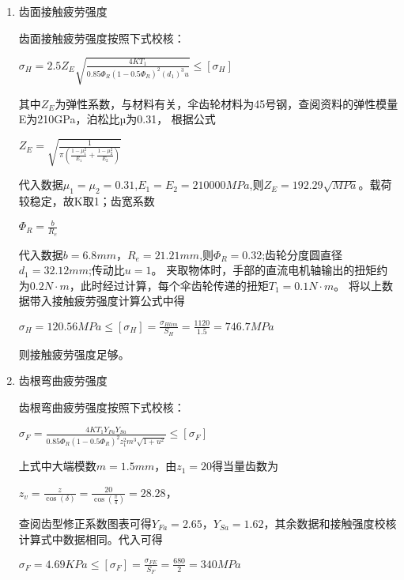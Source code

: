 \begin{enumerate}
\item 齿面接触疲劳强度

齿面接触疲劳强度按照下式校核：

\begin{center}
$\sigma_{H}=2.5Z_{E}\sqrt{\frac{4KT_{1}}{0.85\Phi_{R}(1-0.5\Phi_{R})^{2}(d_{1})^{3}u}}\le[\sigma_{H}]$
\end{center}

其中$Z_{E}$为弹性系数，与材料有关，伞齿轮材料为45号钢，查阅资料的弹性模量E为210GPa，泊松比µ为0.31，
根据公式
\begin{center}
$Z_{E}=\sqrt{\frac{1}{π(\frac{1-\mu_{1}^{2}}{E_{1}}+\frac{1-\mu_{2}^{2}}{E_{2}})}}$
\end{center}

代入数据$\mu_{1}=\mu_{2}=0.31$,$E_{1}=E_{2}=210000MPa$,则$Z_{E}=192.29\sqrt{MPa}$。载荷较稳定，故K取1；齿宽系数

\begin{center}
$\Phi_{R}=\frac{b}{R_{e}}$
\end{center}

代入数据$b=6.8mm$，$R_{e}=21.21mm$,则$\Phi_{R}=0.32$;齿轮分度圆直径$d_{1}=32.12mm$;传动比$u=1$。
夹取物体时，手部的直流电机轴输出的扭矩约为$0.2N \cdot m$，此时经过计算，每个伞齿轮传递的扭矩$T_{1}=0.1N \cdot m$。
将以上数据带入接触疲劳强度计算公式中得

\begin{center}
  $\sigma_{H}=120.56MPa\le[\sigma_{H}]=\frac{\sigma_{Hlim}}{S_{H}}=\frac{1120}{1.5}=746.7MPa$
\end{center}
则接触疲劳强度足够。

\item 齿根弯曲疲劳强度

齿根弯曲疲劳强度按照下式校核：

\begin{center}
$\sigma_{F}=\frac{4KT_{1}Y_{Fa}Y_{Sa}}{0.85\Phi_{R}(1-0.5\Phi_{R})^{2}z_{1}^{2}m^{3}\sqrt{1+u^{2}}}\le[\sigma_{F}]$
\end{center}

上式中大端模数$m=1.5mm$，由$z_{1}=20$得当量齿数为

\begin{center}
 $z_{v}=\frac{z}{\cos(\delta)}=\frac{20}{\cos(\frac{\pi}{4})}=28.28$，
\end{center}

查阅齿型修正系数图表可得$Y_{Fa}=2.65$，$Y_{Sa}=1.62$，其余数据和接触强度校核计算式中数据相同。代入可得

\begin{center}
  $\sigma_{F}=4.69KPa\le[\sigma_{F}]=\frac{\sigma_{FE}}{S_{F}}=\frac{680}{2}=340MPa$
\end{center}
\end{enumerate}

